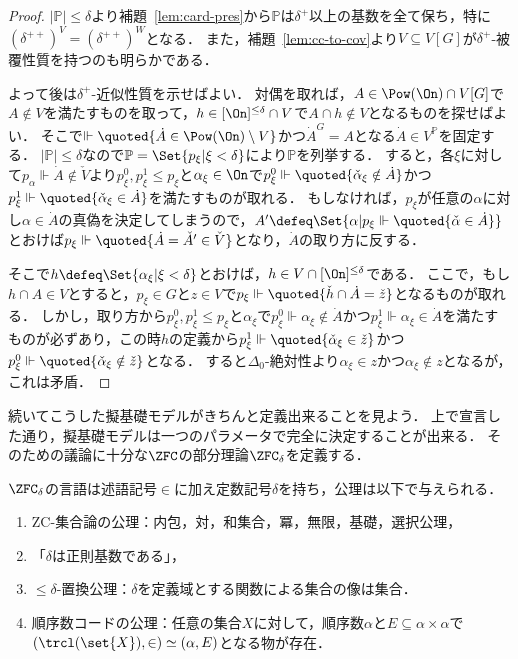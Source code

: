 \documentclass[a4j,leqno]{ltjsarticle}
\theoremstyle{nonumberplain}
\begin{document}
\begin{proof}
 $|\mathbb{P}| \leq \delta$より補題~\ref{lem:card-pres}から$\mathbb{P}$は$\delta^+$以上の基数を全て保ち，特に$(\delta^{++})^V = (\delta^{++})^W$となる．
 また，補題~\ref{lem:cc-to-cov}より$V \subseteq V[G]$が$\delta^+$-被覆性質を持つのも明らかである．

 よって後は$\delta^+$-近似性質を示せばよい．
 対偶を取れば，$A \in \Pow(\On) \cap V[G]$で$A \notin V$を満たすものを取って，$h \in [\On]^{\leq \delta} \cap V$で$A \cap h \notin V$となるものを探せばよい．
 そこで$\Vdash \quoted{\dot{A} \in \Pow(\On) \setminus V}$かつ$\dot{A}^G = A$となる$\dot{A} \in V^{\mathbb{P}}$を固定する．
 $|\mathbb{P}| \leq \delta$なので$\mathbb{P} = \Set{p_\xi | \xi < \delta}$により$\mathbb{P}$を列挙する．
 すると，各$\xi$に対して$p_\alpha \Vdash \dot{A} \notin \check{V}$より$p_\xi^0, p_\xi^1 \leq p_\xi$と$\alpha_\xi \in \On$で$p_\xi^0 \Vdash\quoted{ \check{\alpha}_\xi \notin \dot{A}}$かつ$p_\xi^1 \Vdash \quoted{\check{\alpha}_\xi \in \dot{A}}$を満たすものが取れる．
 もしなければ，$p_\xi$が任意の$\alpha$に対し$\alpha \in \dot{A}$の真偽を決定してしまうので，$A' \defeq \Set{ \alpha | p_\xi \Vdash \quoted{\check{\alpha} \in \dot{A}}}$とおけば$p_\xi \Vdash \quoted{\dot{A} = \check{A}' \in \check{V}}$となり，$\dot{A}$の取り方に反する．

 そこで$h \defeq \Set{\alpha_\xi | \xi < \delta}$とおけば，$h \in V \cap [\On]^{\leq \delta}$である．
 ここで，もし$h \cap A \in V$とすると，$p_\xi \in G$と$z \in V$で$p_\xi \Vdash \quoted{\check{h} \cap \dot{A} = \check{z}}$となるものが取れる．
 しかし，取り方から$p_\xi^0, p_\xi^1 \leq p_\xi$と$\alpha_\xi$で$p_\xi^0 \Vdash \alpha_\xi \notin \dot{A}$かつ$p_\xi^1 \Vdash \alpha_\xi \in \dot{A}$を満たすものが必ずあり，この時$h$の定義から$p_\xi^1 \Vdash \quoted{\check{\alpha}_\xi \in \check{z}}$かつ$p_\xi^0 \Vdash \quoted{\check{\alpha}_\xi \notin \check{z}}$となる．
 すると$\Delta_0$-絶対性より$\alpha_\xi \in z$かつ$\alpha_\xi \notin z$となるが，これは矛盾．
\end{proof}
続いてこうした擬基礎モデルがきちんと定義出来ることを見よう．
上で宣言した通り，擬基礎モデルは一つのパラメータで完全に決定することが出来る．
そのための議論に十分な$\ZFC$の部分理論$\ZFC_\delta$を定義する．
\begin{definition}
 $\ZFC_\delta$の言語は述語記号$\in$に加え定数記号$\delta$を持ち，公理は以下で与えられる．
 \begin{enumerate}
  \item $\mathrm{ZC}$-集合論の公理：内包，対，和集合，冪，無限，基礎，選択公理，
  \item 「$\delta$は正則基数である」，
  \item $\leq\delta$-置換公理：$\delta$を定義域とする関数による集合の像は集合．
  \item 順序数コードの公理：任意の集合$X$に対して，順序数$\alpha$と$E \subseteq \alpha \times \alpha$で$(\trcl(\set{X}), {\in}) \simeq (\alpha, E)$となる物が存在．
 \end{enumerate}
\end{definition}
\end{document}
